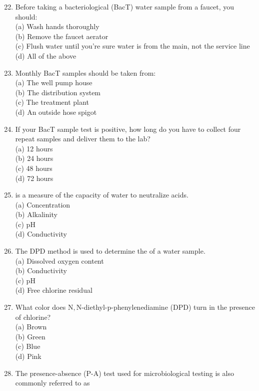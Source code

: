 \documentclass[10pt]{article}
\begin{document}
\begin{enumerate}
  \setcounter{enumi}{21}
  \item Before taking a bacteriological (BacT) water sample from a faucet, you should:\\
(a) Wash hands thoroughly\\
(b) Remove the faucet aerator\\
(c) Flush water until you're sure water is from the main, not the service line\\
(d) All of the above\\

  \item Monthly BacT samples should be taken from:\\
(a) The well pump house\\
(b) The distribution system\\
(c) The treatment plant\\
(d) An outside hose spigot\\

  \item If your BacT sample test is positive, how long do you have to collect four repeat samples and deliver them to the lab?\\
(a) 12 hours\\
(b) 24 hours\\
(c) 48 hours\\
(d) 72 hours\\

  \item is a measure of the capacity of water to neutralize acids.\\
(a) Concentration\\
(b) Alkalinity\\
(c) $\mathrm{pH}$\\
(d) Conductivity\\

  \item The DPD method is used to determine the of a water sample.\\
(a) Dissolved oxygen content\\
(b) Conductivity\\
(c) $\mathrm{pH}$\\
(d) Free chlorine residual\\

  \item What color does $\mathrm{N}, \mathrm{N}$-diethyl-p-phenylenediamine (DPD) turn in the presence of chlorine?\\
(a) Brown\\
(b) Green\\
(c) Blue\\
(d) Pink\\

  \item The presence-absence (P-A) test used for microbiological testing is also commonly referred to as

\end{enumerate}
\end{document}
